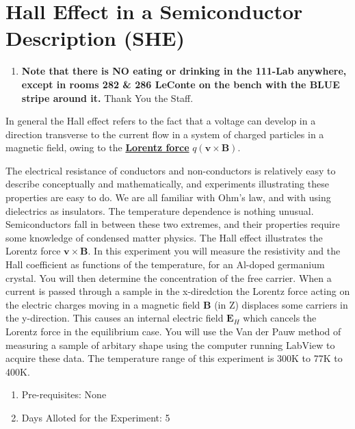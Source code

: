 \documentclass{../lab}
\begin{document}
\maketitle

\tableofcontents

\section{Hall Effect in a Semiconductor Description (SHE)}

\begin{enumerate}
    \item \textbf{Note that there is NO eating or drinking in the 111-Lab anywhere, except in rooms 282 \& 286 LeConte on the bench with the BLUE stripe around it.} Thank You the Staff.

\end{enumerate}

In general the Hall effect refers to the fact that a voltage can develop in a direction transverse to the current flow in a system of charged particles in a magnetic field, owing to the \href{http://www.britannica.com/science/Lorentz-force}{\textbf{Lorentz force}} $q(\mathbf{v} \times \mathbf{B})$.

The electrical resistance of conductors and non-conductors is relatively easy to describe conceptually and mathematically, and experiments illustrating these properties are easy to do. We are all familiar with Ohm's law, and with using dielectrics as insulators. The temperature dependence is nothing unusual. Semiconductors fall in between these two extremes, and their properties require some knowledge of condensed matter physics. The Hall effect illustrates the Lorentz force $\mathbf{v} \times \mathbf{B}$. In this experiment you will measure the resistivity and the Hall coefficient as functions of the temperature, for an Al-doped germanium crystal. You will then determine the concentration of the free carrier. When a current is passed through a sample in the x-diredction the Lorentz force acting on the electric charges moving in a magnetic field \textbf{B} (in Z) displaces some carriers in the y-direction. This causes an internal electric field $\mathbf{E}_H$ which cancels the Lorentz force in the equilibrium case. You will use the Van der Pauw method of measuring a sample of arbitary shape using the computer running LabView to acquire these data. The temperature range of this experiment is 300K to 77K to 400K.

\begin{enumerate}
    \item Pre-requisites: None

    \item Days Alloted for the Experiment: 5
\end{enumerate}
\end{document}
